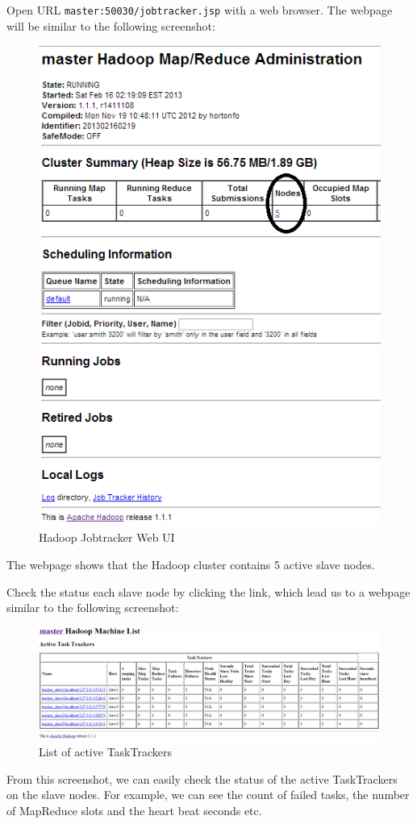 Open URL \verb|master:50030/jobtracker.jsp| with a web browser.
The webpage will be similar to the following screenshot:
\begin{figure}[ht]
  \centering
  \includegraphics[width=.6\textwidth]{figs/5163os_03_02.png}
  \caption{Hadoop Jobtracker Web UI}\label{fig:jobtracker.webui}
\end{figure} 
The webpage shows that the Hadoop cluster contains 5 active slave nodes.

Check the status each slave node by clicking the link, which lead us to a webpage similar to the following screenshot:
\begin{figure}[ht]
  \centering
  \includegraphics[width=.8\textwidth]{figs/5163os_03_03.png}
  \caption{List of active TaskTrackers}\label{fig:active.trackers}
\end{figure} 
From this screenshot, we can easily check the status of the active TaskTrackers on the slave nodes. For example, we can see the count of failed tasks, the number of MapReduce slots and the heart beat seconds etc.

